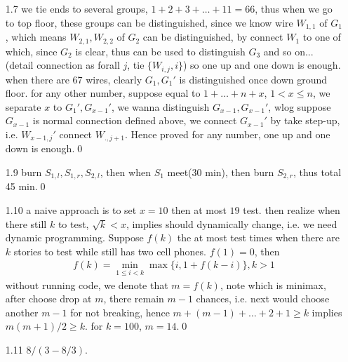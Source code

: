 \documentclass[paper=a4, fontsize=11pt]{scrartcl} %
\numberwithin{equation}{section} %
\numberwithin{figure}{section} %
\numberwithin{table}{section} %
\begin{document}
\begin{itemize}
	 \item[1.7] we tie ends to several groups, $1+2+3+\dots+11=66$, thus when we go to top floor, these groups can be distinguished, since we know wire $W_{1,1}$ of $G_1$, which means $W_{2,1}, W_{2,2}$ of $G_{2}$ can be distinguished, by connect $W_1$ to one of which, since $G_2$ is clear, thus can be used to distinguish $G_3$ and so on... (detail connection as forall $j$, tie $\{W_{i,j}, i\}$) so one up and one down is enough. when there are 67 wires, clearly $G_1,G_1'$ is distinguished once down ground floor. for any other number, suppose equal to $1+\dots+n +x$, $1<x\leq n$, we separate $x$ to $G_1', G_{x-1}'$, we wanna distinguish $G_{x-1},G_{x-1}'$, wlog suppose $G_{x-1}$ is normal connection defined above, we connect $G_{x-1}'$ by take step-up, i.e. $W_{x-1,j}'$ connect $W_{.,j+1}$. Hence proved for any number, one up and one down is enough.\qed
	 \item[1.9] burn $S_{1,l},S_{1,r},S_{2,l}$, then when $S_1$ meet(30 min), then burn $S_{2,r}$, thus total 45 min.\qed
	 \item[1.10] a naive approach is to set $x=10$ then at most $19$ test. then realize when there still $k$ to test, $\sqrt{k} < x$, implies should dynamically change, i.e. we need dynamic programming. Suppose $f(k)$ the at most test times when there are $k$ stories to test while still has two cell phones. $f(1)=0$, then
	 \begin{align}
	 	f(k) = \min_{1\leq i< k} \max \{i, 1+f(k-i)\}, k>1
	 \end{align}
	 without running code, we denote that $m=f(k)$, note which is minimax, after choose drop at $m$, there remain $m-1$ chances, i.e. next would choose another $m-1$ for not breaking, hence $m+(m-1)+\dots + 2+1\geq k$ implies $m(m+1)/2\geq k$. for $k=100$, $m=14$.\qed
	 \item[1.11] $8/(3-8/3)$.
\end{itemize}
\end{document}
